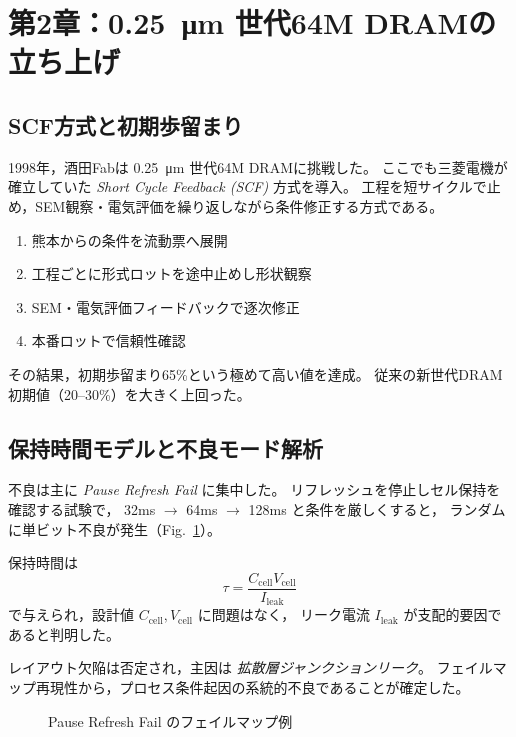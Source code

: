 \documentclass[conference]{IEEEtran}
\begin{document}
\section{第2章：\texorpdfstring{\SI{0.25}{\micro\meter}}{0.25μm} 世代64M DRAMの立ち上げ}

\subsection{SCF方式と初期歩留まり}
1998年，酒田Fabは \SI{0.25}{\micro\meter} 世代64M DRAMに挑戦した。
ここでも三菱電機が確立していた \emph{Short Cycle Feedback (SCF)} 方式を導入。
工程を短サイクルで止め，SEM観察・電気評価を繰り返しながら条件修正する方式である。

\begin{enumerate}
  \item 熊本からの条件を流動票へ展開
  \item 工程ごとに形式ロットを途中止めし形状観察
  \item SEM・電気評価フィードバックで逐次修正
  \item 本番ロットで信頼性確認
\end{enumerate}

その結果，初期歩留まり65\%という極めて高い値を達成。
従来の新世代DRAM初期値（20--30\%）を大きく上回った。

\subsection{保持時間モデルと不良モード解析}
不良は主に \emph{Pause Refresh Fail} に集中した。
リフレッシュを停止しセル保持を確認する試験で，
32ms $\rightarrow$ 64ms $\rightarrow$ 128ms と条件を厳しくすると，
ランダムに単ビット不良が発生（Fig.~\ref{fig:failmap}）。

保持時間は
\[
\tau = \frac{C_{\mathrm{cell}} V_{\mathrm{cell}}}{I_{\mathrm{leak}}}
\]
で与えられ，設計値 $C_{\mathrm{cell}}, V_{\mathrm{cell}}$ に問題はなく，
リーク電流 $I_{\mathrm{leak}}$ が支配的要因であると判明した。

レイアウト欠陥は否定され，主因は \emph{拡散層ジャンクションリーク}。
フェイルマップ再現性から，プロセス条件起因の系統的不良であることが確定した。

\begin{figure}[t]
\centering
{}
\caption{Pause Refresh Fail のフェイルマップ例}
\label{fig:failmap}
\end{figure}
\end{document}
